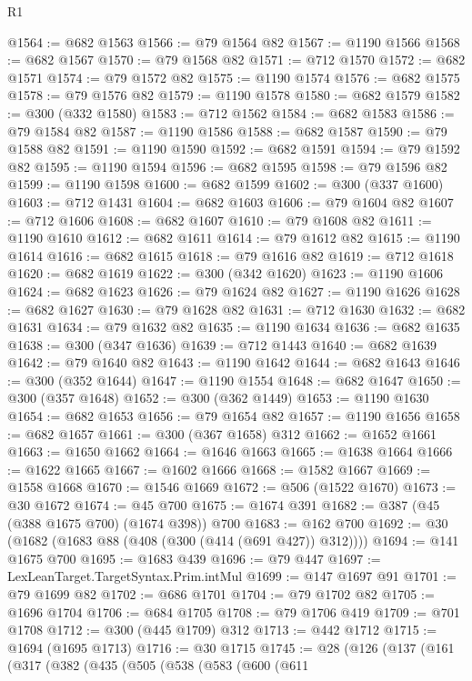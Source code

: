 \begin{lexlean}{R1}
\begin{coremodule}
{{{{{{{{{{{{{{{{{{{{{{{{{{{{{{{{{{{{{{{{{{{{{{{{{{@1564 := @682 @1563
@1566 := @79 @1564 @82
@1567 := @1190 @1566
@1568 := @682 @1567
@1570 := @79 @1568 @82
@1571 := @712 @1570
@1572 := @682 @1571
@1574 := @79 @1572 @82
@1575 := @1190 @1574
@1576 := @682 @1575
@1578 := @79 @1576 @82
@1579 := @1190 @1578
@1580 := @682 @1579
@1582 := @300 (@332 @1580)
@1583 := @712 @1562
@1584 := @682 @1583
@1586 := @79 @1584 @82
@1587 := @1190 @1586
@1588 := @682 @1587
@1590 := @79 @1588 @82
@1591 := @1190 @1590
@1592 := @682 @1591
@1594 := @79 @1592 @82
@1595 := @1190 @1594
@1596 := @682 @1595
@1598 := @79 @1596 @82
@1599 := @1190 @1598
@1600 := @682 @1599
@1602 := @300 (@337 @1600)
@1603 := @712 @1431
@1604 := @682 @1603
@1606 := @79 @1604 @82
@1607 := @712 @1606
@1608 := @682 @1607
@1610 := @79 @1608 @82
@1611 := @1190 @1610
@1612 := @682 @1611
@1614 := @79 @1612 @82
@1615 := @1190 @1614
@1616 := @682 @1615
@1618 := @79 @1616 @82
@1619 := @712 @1618
@1620 := @682 @1619
@1622 := @300 (@342 @1620)
@1623 := @1190 @1606
@1624 := @682 @1623
@1626 := @79 @1624 @82
@1627 := @1190 @1626
@1628 := @682 @1627
@1630 := @79 @1628 @82
@1631 := @712 @1630
@1632 := @682 @1631
@1634 := @79 @1632 @82
@1635 := @1190 @1634
@1636 := @682 @1635
@1638 := @300 (@347 @1636)
@1639 := @712 @1443
@1640 := @682 @1639
@1642 := @79 @1640 @82
@1643 := @1190 @1642
@1644 := @682 @1643
@1646 := @300 (@352 @1644)
@1647 := @1190 @1554
@1648 := @682 @1647
@1650 := @300 (@357 @1648)
@1652 := @300 (@362 @1449)
@1653 := @1190 @1630
@1654 := @682 @1653
@1656 := @79 @1654 @82
@1657 := @1190 @1656
@1658 := @682 @1657
@1661 := @300 (@367 @1658) @312
@1662 := @1652 @1661
@1663 := @1650 @1662
@1664 := @1646 @1663
@1665 := @1638 @1664
@1666 := @1622 @1665
@1667 := @1602 @1666
@1668 := @1582 @1667
@1669 := @1558 @1668
@1670 := @1546 @1669
@1672 := @506 (@1522 @1670)
@1673 := @30 @1672
@1674 := @45 @700
@1675 := @1674 @391
@1682 := @387 (@45 (@388 @1675 @700) (@1674 @398)) @700
@1683 := @162 @700
@1692 := @30 (@1682 (@1683 @88 (@408 (@300 (@414 (@691 @427)) @312))))
@1694 := @141 @1675 @700
@1695 := @1683 @439
@1696 := @79 @447
@1697 := LexLeanTarget.TargetSyntax.Prim.intMul
@1699 := @147 @1697 @91
@1701 := @79 @1699 @82
@1702 := @686 @1701
@1704 := @79 @1702 @82
@1705 := @1696 @1704
@1706 := @684 @1705
@1708 := @79 @1706 @419
@1709 := @701 @1708
@1712 := @300 (@445 @1709) @312
@1713 := @442 @1712
@1715 := @1694 (@1695 @1713)
@1716 := @30 @1715
@1745 := @28
    (@126
      (@137
        (@161
          (@317
            (@382
              (@435
                (@505
                  (@538
                    (@583
                      (@600
                        (@611
}}}}}}}}}}}}}}}}}}}}}}}}}}}}}}}}}}}}}}}}}}}}}}}}}}
\end{coremodule}
\end{lexlean}
